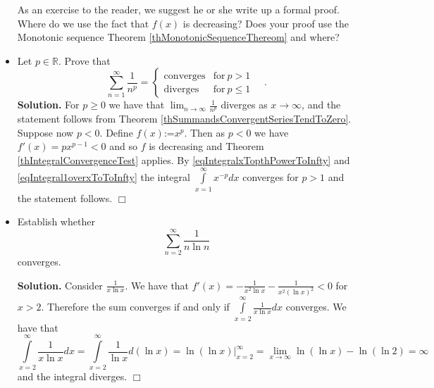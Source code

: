 \documentclass[12pt]{book}
\newcommand{\eqdef}{\textbf{:=}}
\newenvironment{solution}{\textbf{Solution.} }{$\Box$}
\newcommand{\doublebrace}[4]{\left\{\begin{array}{ll} #1 & #2 \\#3 & #4  \end{array} \right.}
\begin{document}
\begin{itemize}
As an exercise to the reader, we suggest he or she write up a formal proof. Where do we use the fact that $f(x)$ is decreasing? Does your proof use the Monotonic sequence Theorem \ref{thMonotonicSequenceThereom} and where?
\item Let $p\in \mathbb R$. Prove that 
\begin{equation}\label{eqSumnToThePthConverges}
\sum\limits_{n=1}^{\infty} \frac{1}{n^p}= \doublebrace{\mathrm{converges}}{\mathrm{for~}p>1}{\mathrm{diverges}}{\mathrm{for~}p\leq 1}\quad .
\end{equation}
\begin{solution}
For $p\geq 0$ we have that $\lim_{n\to \infty} \frac{1}{n^p}$ diverges as $x\to \infty$, and the statement follows from Theorem \ref{thSummandsConvergentSeriesTendToZero}. Suppose now $p< 0$. Define $f(x)\eqdef x^{p}$. Then as $p<0$ we have $f'(x)= px^{p-1}<0$ and so $f$ is decreasing and Theorem \ref{thIntegralConvergenceTest} applies. By \eqref{eqIntegralxTopthPowerToInfty} and \eqref{eqIntegral1overxToToInfty}  the integral $\int\limits_{x=1}^{\infty} x^{-p}dx$ converges for $p>1$ and the statement follows.
\end{solution} 
\item Establish whether
\[ \sum\limits_{n=2}^{\infty}\frac{1}{n\ln n}
\]
converges. 

\begin{solution}
Consider $\frac{1}{x\ln x}$. We have that $\displaystyle f'(x)= -\frac{1}{x^2\ln x}- \frac{1}{x^2(\ln x)^2}<0$ for $x>2$. Therefore the sum converges if and only if $\int\limits_{x=2}^{\infty}\frac{1}{x\ln x}dx$ converges. We have that
\[ \int\limits_{x=2}^{\infty}\frac{1}{x\ln x}dx= \int\limits_{x=2}^\infty \frac{1}{\ln x}d(\ln x) = \left.\ln (\ln x)\right|_{x=2}^{\infty}= \lim\limits_{x\to \infty} \ln (\ln x ) - \ln (\ln 2)=\infty
\]
and the integral diverges.
\end{solution}
\end{itemize}
\end{document}
